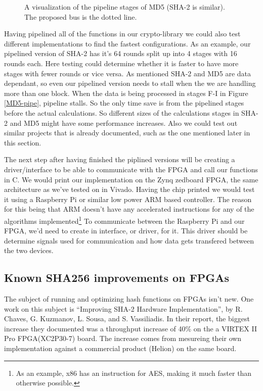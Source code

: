 \documentclass[a4paper, openany]{book}
\begin{document}
\begin{abstact}
\begin{figure}[htbp]
\caption{\label{fig:MD5-pipe}A visualization of the pipeline stages of MD5 (SHA-2 is similar). The proposed bus is the dotted line.}
\end{figure}

Having pipelined all of the functions in our crypto-library we could also test different implementations to find the fastest configurations.
As an example, our pipelined version of SHA-2 has it's 64 rounds split up into 4 stages with 16 rounds each.
Here testing could determine whether it is faster to have more stages with fewer rounds or vice versa.
As mentioned SHA-2 and MD5 are data dependant, so even our pipelined version needs to stall when the we are handling more than one block.
When the data is being processed in stages F-I in Figure \ref{MD5-pipe}, pipeline stalls. So the only time save is from the pipelined stages before the actual calculations.
So different sizes of the calculations stages in SHA-2 and MD5 might have some performance increases.
Also we could test out similar projects that is already documented, such as the one mentioned later in this section.

The next step after having finished the piplined versions will be creating a driver/interface to be able to communicate with the FPGA and call our functions in C.
We would print our implementation on the Zynq zedboard FPGA, the same architecture as we've tested on in Vivado.
Having the chip printed we would test it using a Raspberry Pi or similar low power ARM based controller.
The reason for this being that ARM doesn't have any accelerated instructions for any of the algorithms implemented\footnote{As an example, x86 has an instruction for AES, making it much faster than otherwise possible.}
To communicate between the Raspberry Pi and our FPGA, we'd need to create in interface, or driver, for it.
This driver should be determine signals used for communication and how data gets transfered between the two devices.
\subsection{Known SHA256 improvements on FPGAs}
\label{sec:orgb882ae8}
The subject of running and optimizing hash functions on FPGAs isn't new. One work on this subject is ``Improving SHA-2 Hardware Implementation'', by R. Chaves, G. Kuzmanov, L. Sousa, and S. Vassiliadis.
In their report, the biggest increase they documented was a throughput increase of 40\% on the a VIRTEX II Pro FPGA(XC2P30-7) board.
The increase comes from mesureing their own implementation against a commercial product (Helion) on the same board.


\end{abstact}
\end{document}
